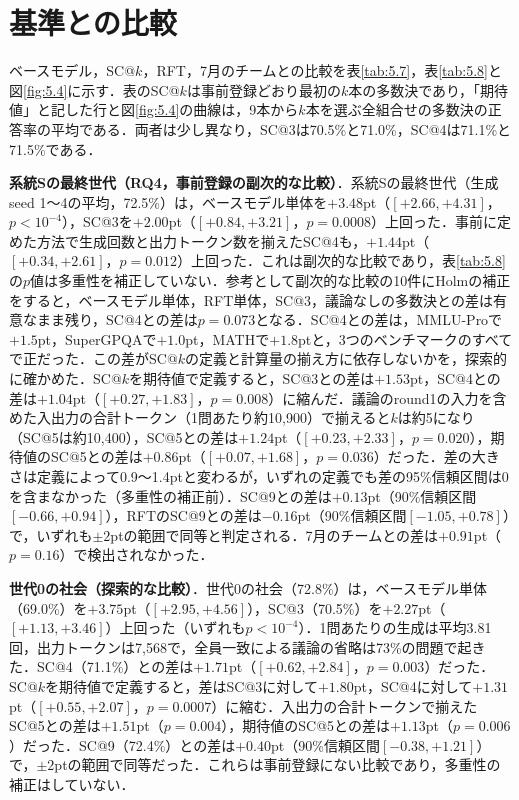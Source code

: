 \section{基準との比較}
\label{sec:5.4}

ベースモデル，SC@$k$，RFT，7月のチームとの比較を表\ref{tab:5.7}，表\ref{tab:5.8}と図\ref{fig:5.4}に示す．表のSC@$k$は事前登録どおり最初の$k$本の多数決であり，「期待値」と記した行と図\ref{fig:5.4}の曲線は，9本から$k$本を選ぶ全組合せの多数決の正答率の平均である．両者は少し異なり，SC@3は70.5\%と71.0\%，SC@4は71.1\%と71.5\%である．

\textbf{系統Sの最終世代（RQ4，事前登録の副次的な比較）}．系統Sの最終世代（生成seed 1〜4の平均，72.5\%）は，ベースモデル単体を$+3.48$pt（$[+2.66, +4.31]$，$p < 10^{-4}$），SC@3を$+2.00$pt（$[+0.84, +3.21]$，$p = 0.0008$）上回った．事前に定めた方法で生成回数と出力トークン数を揃えたSC@4も，$+1.44$pt（$[+0.34, +2.61]$，$p = 0.012$）上回った．これは副次的な比較であり，表\ref{tab:5.8}の$p$値は多重性を補正していない．参考として副次的な比較の10件にHolmの補正をすると，ベースモデル単体，RFT単体，SC@3，議論なしの多数決との差は有意なまま残り，SC@4との差は$p = 0.073$となる．SC@4との差は，MMLU-Proで$+1.5$pt，SuperGPQAで$+1.0$pt，MATHで$+1.8$ptと，3つのベンチマークのすべてで正だった．この差がSC@$k$の定義と計算量の揃え方に依存しないかを，探索的に確かめた．SC@$k$を期待値で定義すると，SC@3との差は$+1.53$pt，SC@4との差は$+1.04$pt（$[+0.27, +1.83]$，$p = 0.008$）に縮んだ．議論のround1の入力を含めた入出力の合計トークン（1問あたり約10,900）で揃えると$k$は約5になり（SC@5は約10,400），SC@5との差は$+1.24$pt（$[+0.23, +2.33]$，$p = 0.020$），期待値のSC@5との差は$+0.86$pt（$[+0.07, +1.68]$，$p = 0.036$）だった．差の大きさは定義によって0.9〜1.4ptと変わるが，いずれの定義でも差の95\%信頼区間は0を含まなかった（多重性の補正前）．SC@9との差は$+0.13$pt（90\%信頼区間$[-0.66, +0.94]$），RFTのSC@9との差は$-0.16$pt（90\%信頼区間$[-1.05, +0.78]$）で，いずれも$\pm 2$ptの範囲で同等と判定される．7月のチームとの差は$+0.91$pt（$p = 0.16$）で検出されなかった．

\textbf{世代0の社会（探索的な比較）}．世代0の社会（72.8\%）は，ベースモデル単体（69.0\%）を$+3.75$pt（$[+2.95, +4.56]$），SC@3（70.5\%）を$+2.27$pt（$[+1.13, +3.46]$）上回った（いずれも$p < 10^{-4}$）．1問あたりの生成は平均3.81回，出力トークンは7,568で，全員一致による議論の省略は73\%の問題で起きた．SC@4（71.1\%）との差は$+1.71$pt（$[+0.62, +2.84]$，$p = 0.003$）だった．SC@$k$を期待値で定義すると，差はSC@3に対して$+1.80$pt，SC@4に対して$+1.31$pt（$[+0.55, +2.07]$，$p = 0.0007$）に縮む．入出力の合計トークンで揃えたSC@5との差は$+1.51$pt（$p = 0.004$），期待値のSC@5との差は$+1.13$pt（$p = 0.006$）だった．SC@9（72.4\%）との差は$+0.40$pt（90\%信頼区間$[-0.38, +1.21]$）で，$\pm 2$ptの範囲で同等だった．これらは事前登録にない比較であり，多重性の補正はしていない．

